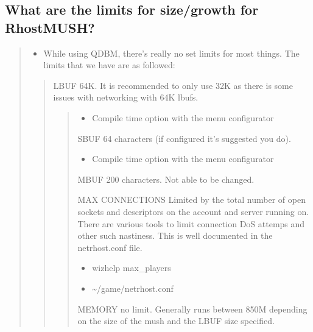 \documentclass[letterpaper,10pt,english]{sphinxmanual}
\begin{document}
\subsection{What are the limits for size/growth for RhostMUSH?}
\label{\detokenize{features:what-are-the-limits-for-size-growth-for-rhostmush}}\begin{quote}
\begin{itemize}
\item {} 
\sphinxAtStartPar
While using QDBM, there’s really no set limits for most things.
The limits that we have are as followed:

\end{itemize}
\begin{quote}

\sphinxAtStartPar
LBUF \sphinxhyphen{} 64K.  It is recommended to only use 32K as there is some issues with networking with 64K lbufs.
\begin{quote}
\begin{itemize}
\item {} 
\sphinxAtStartPar
Compile time option with the menu configurator

\end{itemize}

\sphinxAtStartPar
SBUF \sphinxhyphen{} 64 characters (if configured \textendash{} it’s suggested you do).
\begin{itemize}
\item {} 
\sphinxAtStartPar
Compile time option with the menu configurator

\end{itemize}

\sphinxAtStartPar
MBUF \sphinxhyphen{} 200 characters.  Not able to be changed.

\sphinxAtStartPar
MAX CONNECTIONS \sphinxhyphen{} Limited by the total number of open sockets and descriptors on the account and server running on.  There are various tools to limit connection DoS attemps and other such nastiness.  This is well documented in the netrhost.conf file.
\begin{itemize}
\item {} 
\sphinxAtStartPar
wizhelp max\_players

\item {} 
\sphinxAtStartPar
\textasciitilde{}/game/netrhost.conf

\end{itemize}

\sphinxAtStartPar
MEMORY \sphinxhyphen{} no limit.  Generally runs between 8\sphinxhyphen{}50M depending on the size of the mush and the LBUF size specified.


\end{quote}
\end{quote}
\end{quote}
\end{document}
